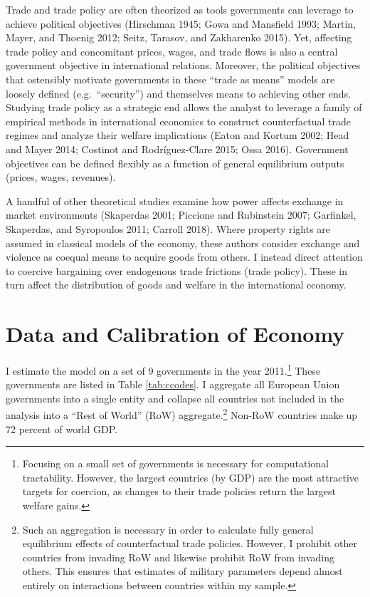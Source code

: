 \documentclass{puthesis}
\begin{document}
Trade and trade policy are often theorized as tools governments can
leverage to achieve political objectives (Hirschman 1945; Gowa and
Mansfield 1993; Martin, Mayer, and Thoenig 2012; Seitz, Tarasov, and
Zakharenko 2015). Yet, affecting trade policy and concomitant prices,
wages, and trade flows is also a central government objective in
international relations. Moreover, the political objectives that
ostensibly motivate governments in these ``trade as means'' models are
loosely defined (e.g.~``security'') and themselves means to achieving
other ends. Studying trade policy as a strategic end allows the analyst
to leverage a family of empirical methods in international economics to
construct counterfactual trade regimes and analyze their welfare
implications (Eaton and Kortum 2002; Head and Mayer 2014; Costinot and
Rodríguez-Clare 2015; Ossa 2016). Government objectives can be defined
flexibly as a function of general equilibrium outputs (prices, wages,
revenues).

A handful of other theoretical studies examine how power affects
exchange in market environments (Skaperdas 2001; Piccione and Rubinstein
2007; Garfinkel, Skaperdas, and Syropoulos 2011; Carroll 2018). Where
property rights are assumed in classical models of the economy, these
authors consider exchange and violence as coequal means to acquire goods
from others. I instead direct attention to coercive bargaining over
endogenous trade frictions (trade policy). These in turn affect the
distribution of goods and welfare in the international economy.

\section{Data and Calibration of Economy}

I estimate the model on a set of 9 governments in the year
2011.\footnote{Focusing on a small set of governments is necessary for
  computational tractability. However, the largest countries (by GDP)
  are the most attractive targets for coercion, as changes to their
  trade policies return the largest welfare gains.} These governments
are listed in Table \ref{tab:ccodes}. I aggregate all European Union
governments into a single entity and collapse all countries not included
in the analysis into a ``Rest of World'' (RoW) aggregate.\footnote{Such
  an aggregation is necessary in order to calculate fully general
  equilibrium effects of counterfactual trade policies. However, I
  prohibit other countries from invading RoW and likewise prohibit RoW
  from invading others. This ensures that estimates of military
  parameters depend almost entirely on interactions between countries
  within my sample.} Non-RoW countries make up 72 percent of world GDP.
\end{document}
